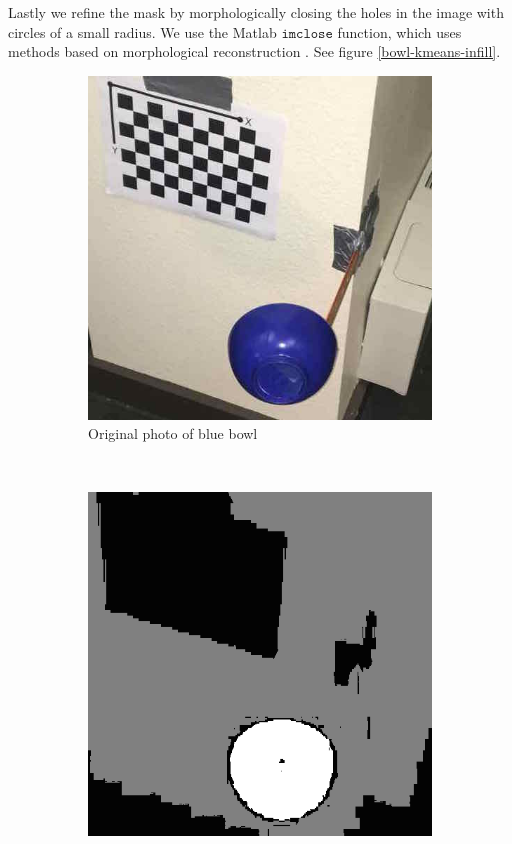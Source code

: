 \documentclass[10pt,twocolumn,letterpaper]{article}
\begin{document}
Lastly we refine the mask by morphologically closing the holes in the image with circles of a small radius. We use the Matlab $\texttt{imclose}$ function, which uses methods based on morphological reconstruction \cite{soille2013morphological}. See figure \ref{bowl-kmeans-infill}.

\begin{figure}[ht]
    \centering
    \begin{subfigure}[t]{0.2\textwidth}
        \centering
        \includegraphics[width=\textwidth]{bluebowl_5.jpg}
        \caption{Original photo of blue bowl}
    \end{subfigure}
    ~ 
    \begin{subfigure}[t]{0.2\textwidth}
        \centering
        \includegraphics[width=\textwidth]{cluster_ids.png}

\end{subfigure}
\end{figure}
\end{document}
